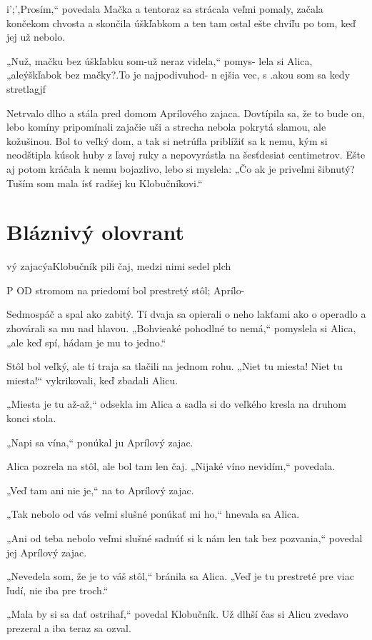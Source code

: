 \documentclass[12pt]{book}
\begin{document}
\begin{Parallel}[p]{}{}
{i';',Prosím,“ povedala Mačka a tentoraz sa strácala veľmi
pomaly, začala končekom chvosta a skončila úškľabkom
a ten tam ostal ešte chvíľu po tom, keď jej už nebolo.

„Nuž, mačku bez úškľabku som-už neraz videla,“ pomys-
lela si Alica, „aleýškľabok bez mačky?.To je najpodivuhod-
n ejšia vec, s .akou som sa kedy stretlagjf

Netrvalo dlho a stála pred domom Aprílového zajaca.
Dovtípila sa, že to bude on, lebo komíny pripomínali zajačie
uši a strecha nebola pokrytá slamou, ale kožušinou. Bol to
veľký dom, a tak si netrúfla priblížiť sa k nemu, kým si
neodštipla kúsok huby z ľavej ruky a nepovyrástla na
šesťdesiat centimetrov. Ešte aj potom kráčala k nemu
bojazlivo, lebo si myslela: „Čo ak je priveľmi šibnutý?
Tuším som mala ísť radšej ku Klobučníkovi.“

\section{Bláznivý olovrant}

  vý  zajacýaKlobučník pili čaj, medzi nimi sedel plch

P OD stromom na priedomí bol prestretý stôl; Aprílo-

Sedmospáč a spal ako zabitý. Tí dvaja sa opierali o neho
lakťami ako o operadlo a zhovárali sa mu nad hlavou.
„Bohvieaké pohodlné to nemá,“ pomyslela si Alica, „ale
keď spí, hádam je mu to jedno.“

Stôl bol veľký, ale tí traja sa tlačili na jednom rohu. „Niet
tu miesta! Niet tu miesta!“ vykrikovali, keď zbadali Alicu.

„Miesta je tu až-až,“ odsekla im Alica a sadla si do
veľkého kresla na druhom konci stola.

„Napi sa vína,“ ponúkal ju Aprílový zajac.

Alica pozrela na stôl, ale bol tam len čaj. „Nijaké víno
nevidím,“ povedala.

„Veď tam ani nie je,“ na to Aprílový zajac.

„Tak nebolo od vás veľmi slušné ponúkať mi ho,“ hnevala
sa Alica.

„Ani od teba nebolo veľmi slušné sadnúť si k nám len tak
bez pozvania,“ povedal jej Aprílový zajac.

„Nevedela som, že je to váš stôl,“ bránila sa Alica. „Veď
je tu prestreté pre viac ľudí, nie iba pre troch.“

„Mala by si sa dať ostrihaf,“ povedal Klobučník. Už dlhší
čas si Alicu zvedavo prezeral a iba teraz sa ozval.

}
\end{Parallel}
\end{document}
